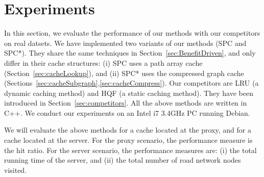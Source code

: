 

\section{Experiments}\label{sec:experiments}
%
In this section, we evaluate the performance of our methods with our competitors on real datsets.
We have implemented two variants of our methods (SPC and SPC*).
They share the same techniques in Section~\ref{sec:BenefitDriven},
and only differ in their cache structures:
(i) SPC uses a path array cache (Section~\ref{sec:cacheLookup}), and (ii) SPC* uses the compressed graph cache (Sections~\ref{sec:cacheSubgraph},\ref{sec:cacheCompress}).
%
Our competitors are LRU (a dynamic caching method) and HQF (a static caching method).
They have been introduced in Section~\ref{sec:competitors}.
All the above methods are written in C++.
We conduct our experiments on an Intel i7 3.4GHz PC running Debian.


We will evaluate the above methods for a cache located at the proxy, and for a cache located at the server.
For the proxy scenario, the performance measure is the hit ratio.
For the server scenario, the performance measures are: (i) the total running time of the server,
and (ii) the total number of road network nodes visited.













